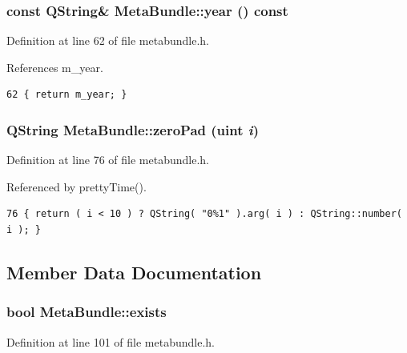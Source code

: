 \subsubsection{\setlength{\rightskip}{0pt plus 5cm}const QString\& Meta\-Bundle::year () const\hspace{0.3cm}{\tt  [inline]}}\label{classMetaBundle_MetaBundlea13}




Definition at line 62 of file metabundle.h.

References m\_\-year.



\footnotesize\begin{verbatim}62 { return m_year; }
\end{verbatim}\normalsize 
{}
\subsubsection{\setlength{\rightskip}{0pt plus 5cm}QString Meta\-Bundle::zero\-Pad (uint {\em i})\hspace{0.3cm}{\tt  [inline, static]}}\label{classMetaBundle_MetaBundlee3}




Definition at line 76 of file metabundle.h.

Referenced by pretty\-Time().



\footnotesize\begin{verbatim}76 { return ( i < 10 ) ? QString( "0%1" ).arg( i ) : QString::number( i ); }
\end{verbatim}\normalsize 


\subsection{Member Data Documentation}
\subsubsection{\setlength{\rightskip}{0pt plus 5cm}bool {\bf Meta\-Bundle::exists}\hspace{0.3cm}{\tt  [private]}}\label{classMetaBundle_MetaBundler11}




Definition at line 101 of file metabundle.h.

